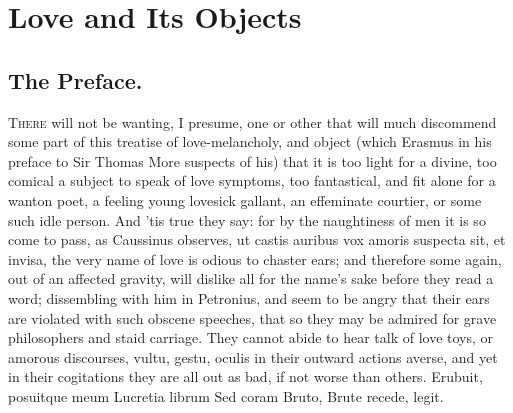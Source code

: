 \chapter{Love and Its Objects}
{
\section{The Preface.}

\lettrine{T}{here} will not be wanting, I presume, one or other that will much
discommend some part of this treatise of love-melancholy, and object
(which Erasmus in his preface to Sir Thomas More suspects of his)
that it is too light for a divine, too comical a subject to speak of
love symptoms, too fantastical, and fit alone for a wanton poet, a
feeling young lovesick gallant, an effeminate courtier, or some such
idle person. And 'tis true they say: for by the naughtiness of men it
is so come to pass, as  Caussinus observes, ut castis auribus vox
amoris suspecta sit, et invisa, the very name of love is odious to
chaster ears; and therefore some again, out of an affected gravity,
will dislike all for the name's sake before they read a word;
dissembling with him in Petronius, and seem to be angry that
their ears are violated with such obscene speeches, that so they may be
admired for grave philosophers and staid carriage. They cannot abide to
hear talk of love toys, or amorous discourses, vultu, gestu, oculis in
their outward actions averse, and yet in their cogitations they are all
out as bad, if not worse than others.
Erubuit, posuitque meum Lucretia librum
Sed coram Bruto, Brute recede, legit.

}
